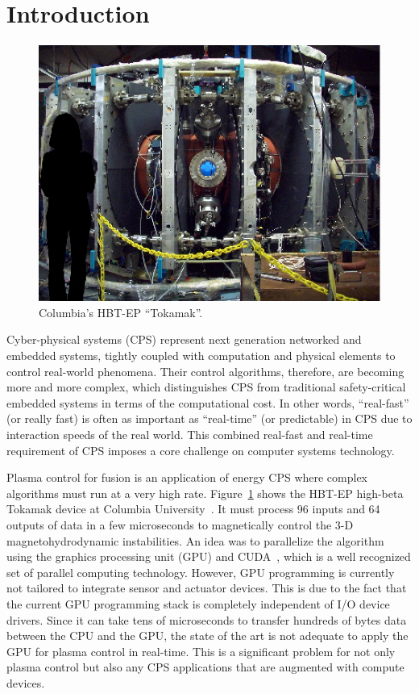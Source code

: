 \section{Introduction}
\label{sec:introduction}

\begin{figure}[t]
 \centering
 \includegraphics[width=0.96\hsize]{eps/tokamak.eps}
 \caption{Columbia's HBT-EP ``Tokamak''.}
 \label{fig:tokamak}
\end{figure}

Cyber-physical systems (CPS) represent next generation networked and
embedded systems, tightly coupled with computation and physical
elements to control real-world phenomena.
Their control algorithms, therefore, are becoming more and more complex,
which distinguishes CPS from traditional safety-critical embedded
systems in terms of the computational cost.
In other words, ``real-fast'' (or really fast) is often as important as
``real-time'' (or predictable) in CPS due to interaction speeds of the
real world.
This combined real-fast and real-time requirement of CPS imposes a
core challenge on computer systems technology.

Plasma control for fusion is an application of energy CPS where
complex algorithms must run at a very high rate.
Figure~\ref{fig:tokamak} shows the HBT-EP high-beta Tokamak device
at Columbia University~\cite{Maurer_PPCF11,Rath_FED12}. It must
process 96 inputs and 64 outputs of data in a few microseconds to
magnetically control the 3-D magnetohydrodynamic instabilities. An idea
was to parallelize the algorithm using the graphics processing unit
(GPU) and CUDA~\cite{CUDA}, which is a well recognized set of parallel
computing technology. However, GPU programming is currently not
tailored to integrate sensor and actuator devices. This is due to the
fact that the current GPU programming stack is completely independent
of I/O device drivers. Since it can take tens of microseconds to
transfer hundreds of bytes data between the CPU and the GPU, the state
of the art is not adequate to apply the GPU for plasma control in
real-time. This is a significant problem for not only plasma control
but also any CPS applications that are augmented with compute devices.

